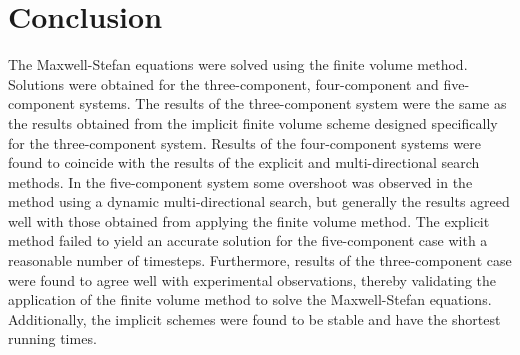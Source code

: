 \documentclass[11]{Report}
\begin{document}
\section*{Conclusion}
The Maxwell-Stefan equations were solved using the finite volume method. Solutions were obtained for the three-component, four-component and five-component systems. The results of the three-component system were the same as the results obtained from the implicit finite volume scheme designed specifically for the three-component system. Results of the four-component systems were found to coincide with the results of the explicit and multi-directional search methods. In the five-component system some overshoot was observed in the method using a dynamic multi-directional search, but generally the results agreed well with those obtained from applying the finite volume method. The explicit method failed to yield an accurate solution for the five-component case with a reasonable number of timesteps. Furthermore, results of the three-component case were found to agree well with experimental observations, thereby validating the application of the finite volume method to solve the Maxwell-Stefan equations. Additionally, the implicit schemes were found to be stable and have the shortest running times.
\end{document}
